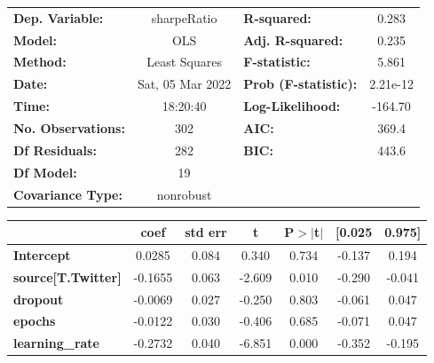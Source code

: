 \begin{center}
\begin{tabular}{lclc}
\toprule
\textbf{Dep. Variable:}                   &   sharpeRatio    & \textbf{  R-squared:         } &     0.283   \\
\textbf{Model:}                           &       OLS        & \textbf{  Adj. R-squared:    } &     0.235   \\
\textbf{Method:}                          &  Least Squares   & \textbf{  F-statistic:       } &     5.861   \\
\textbf{Date:}                            & Sat, 05 Mar 2022 & \textbf{  Prob (F-statistic):} &  2.21e-12   \\
\textbf{Time:}                            &     18:20:40     & \textbf{  Log-Likelihood:    } &   -164.70   \\
\textbf{No. Observations:}                &         302      & \textbf{  AIC:               } &     369.4   \\
\textbf{Df Residuals:}                    &         282      & \textbf{  BIC:               } &     443.6   \\
\textbf{Df Model:}                        &          19      & \textbf{                     } &             \\
\textbf{Covariance Type:}                 &    nonrobust     & \textbf{                     } &             \\
\bottomrule
\end{tabular}
\begin{tabular}{lcccccc}
                                          & \textbf{coef} & \textbf{std err} & \textbf{t} & \textbf{P$> |$t$|$} & \textbf{[0.025} & \textbf{0.975]}  \\
\midrule
\textbf{Intercept}                        &       0.0285  &        0.084     &     0.340  &         0.734        &       -0.137    &        0.194     \\
\textbf{source[T.Twitter]}                &      -0.1655  &        0.063     &    -2.609  &         0.010        &       -0.290    &       -0.041     \\
\textbf{dropout}                          &      -0.0069  &        0.027     &    -0.250  &         0.803        &       -0.061    &        0.047     \\
\textbf{epochs}                           &      -0.0122  &        0.030     &    -0.406  &         0.685        &       -0.071    &        0.047     \\
\textbf{learning\_rate}                   &      -0.2732  &        0.040     &    -6.851  &         0.000        &       -0.352    &       -0.195     \\

\end{tabular}
\end{center}
